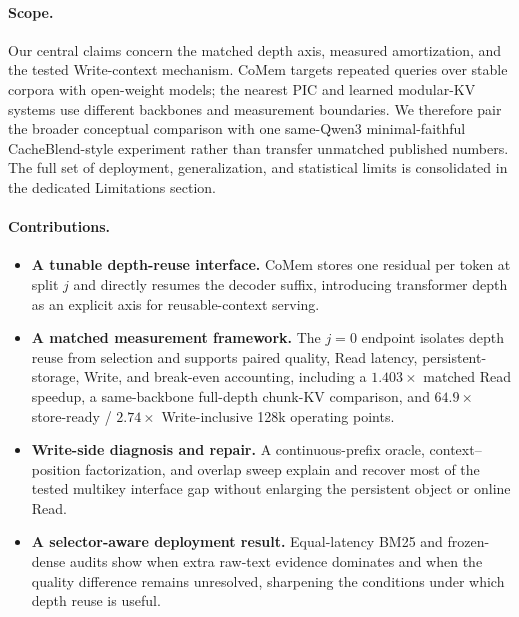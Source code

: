 \paragraph{Scope.}
Our central claims concern the matched depth axis, measured amortization, and
the tested Write-context mechanism. CoMem targets repeated queries over stable
corpora with open-weight models; the nearest PIC and learned modular-KV systems
use different backbones and measurement boundaries. We therefore pair the
broader conceptual comparison with one same-Qwen3 minimal-faithful
CacheBlend-style experiment rather than transfer unmatched published numbers.
The full set of deployment, generalization, and statistical limits is
consolidated in the dedicated Limitations section.

\paragraph{Contributions.}
\begin{itemize}[leftmargin=1.2em,itemsep=1pt,topsep=2pt]
\item \textbf{A tunable depth-reuse interface.} CoMem stores one residual per
token at split $j$ and directly resumes the decoder suffix, introducing
transformer depth as an explicit axis for reusable-context serving.
\item \textbf{A matched measurement framework.} The $j{=}0$ endpoint isolates
depth reuse from selection and supports paired quality, Read latency,
persistent-storage, Write, and break-even accounting, including a
$1.403\times$ matched Read speedup, a same-backbone full-depth chunk-KV
comparison, and $64.9\times$ store-ready / $2.74\times$ Write-inclusive 128k
operating points.
\item \textbf{Write-side diagnosis and repair.} A continuous-prefix oracle,
context--position factorization, and overlap sweep explain and recover most of
the tested multikey interface gap without enlarging the persistent object or
online Read.
\item \textbf{A selector-aware deployment result.} Equal-latency BM25 and
frozen-dense audits show when extra raw-text evidence dominates and when the
quality difference remains unresolved, sharpening the conditions under which
depth reuse is useful.
\end{itemize}
